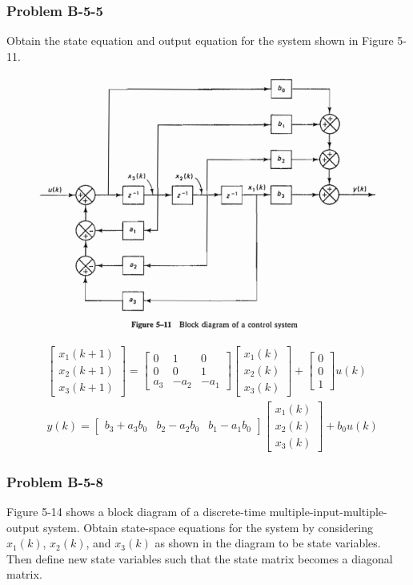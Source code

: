 \subsubsection*{Problem B-5-5}
Obtain the state equation and output equation for the system shown in Figure 5-11.
\begin{figure}[H]
	\centering
	\includegraphics[width=0.6\linewidth]{OgataB-5-5.png}
	\label{fig:ogatab-5-5}
\end{figure}

\begin{align*}
& \begin{bmatrix}
x_1(k+1) \\
x_2(k+1) \\
x_3(k+1)
\end{bmatrix}= \begin{bmatrix}
0   & 1    & 0    \\
0   & 0    & 1    \\
a_3 & -a_2 & -a_1
\end{bmatrix}\begin{bmatrix}
x_1(k) \\
x_2(k) \\
x_3(k)
\end{bmatrix}+ \begin{bmatrix}
0 \\
0 \\
1
\end{bmatrix} u(k) \\
& y(k) = \begin{bmatrix} b_3+a_3b_0
	& b_2 -a_2b_0 & b_1 -a_1b_0 
 \end{bmatrix}\begin{bmatrix}
 x_1(k) \\
 x_2(k) \\
 x_3(k)
 \end{bmatrix} + b_0 u(k)
\end{align*}
\subsubsection*{Problem B-5-8}
Figure 5-14 shows a block diagram of a discrete-time multiple-input-multiple-output system. Obtain state-space equations for the system by considering $x_1(k)$, $x_2(k)$, and $x_3(k)$ as shown in the diagram to be state variables. Then define new state variables such that the state matrix becomes a diagonal matrix.

